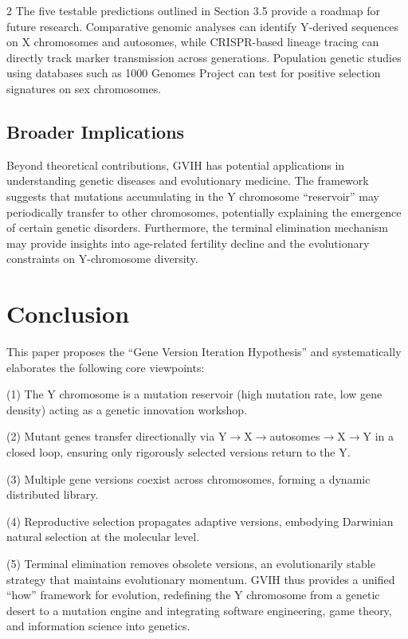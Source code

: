 \documentclass{base}
\begin{document}
\begin{multicols}{2}
The five testable predictions outlined in Section 3.5 provide a roadmap for future research. Comparative genomic analyses can identify Y-derived sequences on X chromosomes and autosomes, while CRISPR-based lineage tracing can directly track marker transmission across generations. Population genetic studies using databases such as 1000 Genomes Project can test for positive selection signatures on sex chromosomes.

\subsection{Broader Implications}
Beyond theoretical contributions, GVIH has potential applications in understanding genetic diseases and evolutionary medicine. The framework suggests that mutations accumulating in the Y chromosome ``reservoir'' may periodically transfer to other chromosomes, potentially explaining the emergence of certain genetic disorders. Furthermore, the terminal elimination mechanism may provide insights into age-related fertility decline and the evolutionary constraints on Y-chromosome diversity.

\section{Conclusion}
This paper proposes the ``Gene Version Iteration Hypothesis'' and systematically elaborates the following core viewpoints:

(1) The Y chromosome is a mutation reservoir (high mutation rate, low gene density) acting as a genetic innovation workshop.

(2) Mutant genes transfer directionally via Y$\rightarrow$X$\rightarrow$autosomes$\rightarrow$X$\rightarrow$Y in a closed loop, ensuring only rigorously selected versions return to the Y. 

(3) Multiple gene versions coexist across chromosomes, forming a dynamic distributed library. 

(4) Reproductive selection propagates adaptive versions, embodying Darwinian natural selection at the molecular level. 

(5) Terminal elimination removes obsolete versions, an evolutionarily stable strategy that maintains evolutionary momentum. GVIH thus provides a unified ``how'' framework for evolution, redefining the Y chromosome from a genetic desert to a mutation engine and integrating software engineering, game theory, and information science into genetics.


\end{multicols}
\end{document}
